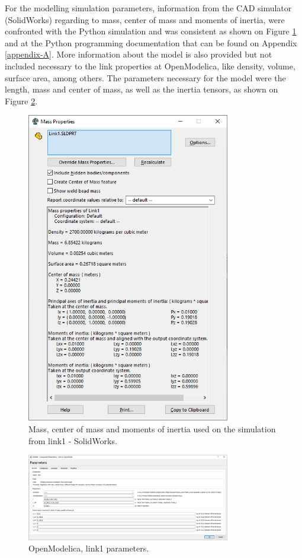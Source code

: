 \documentclass[transmag]{IEEEtran}
\begin{document}
For the modelling simulation parameters, information from the CAD simulator (SolidWorks) regarding to mass, center of mass and moments of inertia, were confronted with the Python simulation and was consistent as shown on Figure \ref{MassProperties} and at the Python programming documentation that can be found on Appendix \ref{appendix-A}. More information about the model is also provided but not included necessary to the link properties at OpenModelica, like density, volume, surface area, among others. The parameters necessary for the model were the length, mass and center of mass, as well as the inertia tensors, as shown on Figure \ref{Link1Parameters}. 



\begin{figure}
\centerline{\includegraphics[width=3.5in]{./images/MassProperties}}
\caption{Mass, center of mass and moments of inertia used on the simulation from link1 - SolidWorks.\label{MassProperties}}
\end{figure}


\begin{figure}
\centerline{\includegraphics[width=3.5in]{./images/Link1Parameters}}
\caption{OpenModelica, link1 parameters.\label{Link1Parameters}}
\end{figure}
 
\end{document}
